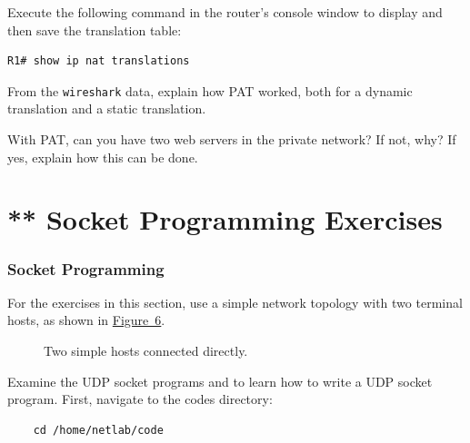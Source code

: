\documentclass{UTNetLab}
\begin{document}
    Execute the following command in the router's console window to display and then save the translation table:
	
	\begin{lstlisting}[language=cisco, frame=trBL]
	R1# show ip nat translations
	\end{lstlisting}
	
    \begin{report}
    \item From the \lstinline{wireshark} data, explain how PAT worked, both for a dynamic translation and a static translation.
    
    \item With PAT, can you have two web servers in the private network?
    If not, why?
    If yes, explain how this can be done.
    \end{report}

\part{** Socket Programming Exercises}
\section{Socket Programming}

	For the exercises in this section, use a simple network topology with two terminal hosts, as shown in \hyperref[fig:two-term]{Figure~6}.
 	\begin{figure}[H]
		\centering
		\caption{Two simple hosts connected directly.}
		\label{fig:two-term}
	\end{figure}
	
    Examine the UDP socket programs  and  to learn how to write a UDP socket program. First, navigate to the codes directory:
    
    \begin{lstlisting}
    cd /home/netlab/code
    \end{lstlisting}
    
\end{document}
